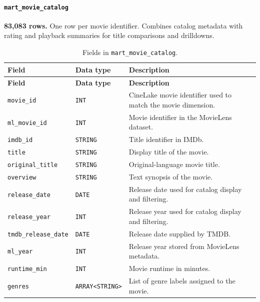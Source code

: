 \documentclass[a4paper,12pt]{article}
\newcommand{\dbsep}{\_\allowbreak}
\begin{document}
\paragraph{\texttt{mart\dbsep movie\dbsep catalog}}
\textbf{83,083 rows.} One row per movie identifier.
Combines catalog metadata with rating and playback summaries for title comparisons and drilldowns.

\begingroup
\small
\setlength{\tabcolsep}{4pt}
\renewcommand{\arraystretch}{1.1}
\begin{longtable}{@{}>{\raggedright\arraybackslash}p{}
                    >{\raggedright\arraybackslash}p{}
                    >{\raggedright\arraybackslash}p{}@{}}
\caption{Fields in \texttt{mart\dbsep movie\dbsep catalog}.}\\
\toprule
\textbf{Field} & \textbf{Data type} & \textbf{Description}\\
\midrule
\endfirsthead
\toprule
\textbf{Field} & \textbf{Data type} & \textbf{Description}\\
\midrule
\endhead
\bottomrule
\endfoot
\texttt{movie\dbsep id} & \texttt{INT} & CineLake movie identifier used to match the movie dimension.\\
\texttt{ml\dbsep movie\dbsep id} & \texttt{INT} & Movie identifier in the MovieLens dataset.\\
\texttt{imdb\dbsep id} & \texttt{STRING} & Title identifier in IMDb.\\
\texttt{title} & \texttt{STRING} & Display title of the movie.\\
\texttt{original\dbsep title} & \texttt{STRING} & Original-language movie title.\\
\texttt{overview} & \texttt{STRING} & Text synopsis of the movie.\\
\texttt{release\dbsep date} & \texttt{DATE} & Release date used for catalog display and filtering.\\
\texttt{release\dbsep year} & \texttt{INT} & Release year used for catalog display and filtering.\\
\texttt{tmdb\dbsep release\dbsep date} & \texttt{DATE} & Release date supplied by TMDB.\\
\texttt{ml\dbsep year} & \texttt{INT} & Release year stored from MovieLens metadata.\\
\texttt{runtime\dbsep min} & \texttt{INT} & Movie runtime in minutes.\\
\texttt{genres} & \texttt{ARRAY\allowbreak\textless{}STRING\textgreater{}} & List of genre labels assigned to the movie.\\

\end{longtable}
\end{document}
